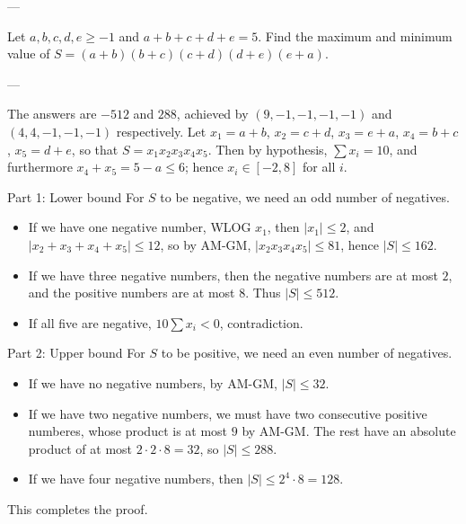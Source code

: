 
---

Let $a,b,c,d,e\ge-1$ and $a+b+c+d+e=5$. Find the maximum and minimum value of $S=(a+b)(b+c)(c+d)(d+e)(e+a)$.

---

The answers are $-512$ and $288$, achieved by $(9,-1,-1,-1,-1)$ and $(4,4,-1,-1,-1)$ respectively. Let $x_1=a+b$, $x_2=c+d$, $x_3=e+a$, $x_4=b+c$, $x_5=d+e$, so that $S=x_1x_2x_3x_4x_5$. Then by hypothesis, $\sum x_i=10$, and furthermore $x_4+x_5=5-a\le6$; hence $x_i\in[-2,8]$ for all $i$.
\begin{customenv}{Part 1: Lower bound}
    For $S$ to be negative, we need an odd number of negatives.
    \begin{itemize}
        \item If we have one negative number, WLOG $x_1$, then $|x_1|\le2$, and $|x_2+x_3+x_4+x_5|\le12$, so by AM-GM, $|x_2x_3x_4x_5|\le81$, hence $|S|\le162$.
        \item If we have three negative numbers, then the negative numbers are at most $2$, and the positive numbers are at most $8$. Thus $|S|\le512$.
        \item If all five are negative, $10\sum x_i<0$, contradiction.
    \end{itemize}
\end{customenv}
\begin{customenv}{Part 2: Upper bound}
    For $S$ to be positive, we need an even number of negatives.
    \begin{itemize}
        \item If we have no negative numbers, by AM-GM, $|S|\le32$.
        \item If we have two negative numbers, we must have two consecutive positive numberes, whose product is at most $9$ by AM-GM. The rest have an absolute product of at most $2\cdot2\cdot8=32$, so $|S|\le288$.
        \item If we have four negative numbers, then $|S|\le2^4\cdot8=128$.
    \end{itemize}
\end{customenv}
\noindent This completes the proof.
